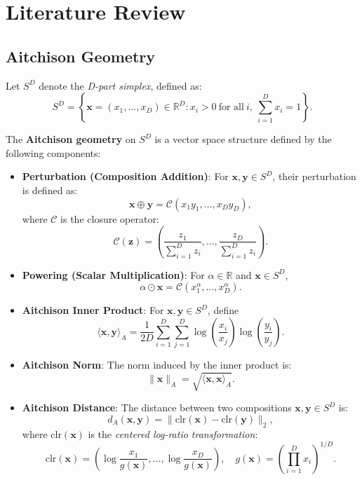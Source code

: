 \documentclass[article]{abntex2}
\begin{document}
\section{Literature Review}



\subsection*{Aitchison Geometry}

Let $S^D$ denote the \emph{D-part simplex}, defined as:
\[
S^D = \left\{ \mathbf{x} = (x_1, \dots, x_D) \in \mathbb{R}^D : x_i > 0 \ \text{for all} \ i, \ \sum_{i=1}^D x_i = 1 \right\}.
\]

The \textbf{Aitchison geometry} on $S^D$ is a vector space structure defined by the following components:

\begin{itemize}
    \item \textbf{Perturbation (Composition Addition)}: For $\mathbf{x}, \mathbf{y} \in S^D$, their perturbation is defined as:
    \[
    \mathbf{x} \oplus \mathbf{y} = \mathcal{C}(x_1 y_1, \dots, x_D y_D),
    \]
    where $\mathcal{C}$ is the closure operator:
    \[
    \mathcal{C}(\mathbf{z}) = \left( \frac{z_1}{\sum_{i=1}^D z_i}, \dots, \frac{z_D}{\sum_{i=1}^D z_i} \right).
    \]
    
    \item \textbf{Powering (Scalar Multiplication)}: For $\alpha \in \mathbb{R}$ and $\mathbf{x} \in S^D$,
    \[
    \alpha \odot \mathbf{x} = \mathcal{C}(x_1^\alpha, \dots, x_D^\alpha).
    \]
    
    \item \textbf{Aitchison Inner Product}: For $\mathbf{x}, \mathbf{y} \in S^D$, define
    \[
    \langle \mathbf{x}, \mathbf{y} \rangle_A = \frac{1}{2D} \sum_{i=1}^D \sum_{j=1}^D \log\left(\frac{x_i}{x_j}\right) \log\left(\frac{y_i}{y_j}\right).
    \]
    
    \item \textbf{Aitchison Norm}: The norm induced by the inner product is:
    \[
    \|\mathbf{x}\|_A = \sqrt{\langle \mathbf{x}, \mathbf{x} \rangle_A}.
    \]
    
    \item \textbf{Aitchison Distance}: The distance between two compositions $\mathbf{x}, \mathbf{y} \in S^D$ is:
    \[
    d_A(\mathbf{x}, \mathbf{y}) = \|\text{clr}(\mathbf{x}) - \text{clr}(\mathbf{y})\|_2,
    \]
    where $\text{clr}(\mathbf{x})$ is the \emph{centered log-ratio transformation}:
    \[
    \text{clr}(\mathbf{x}) = \left( \log\frac{x_1}{g(\mathbf{x})}, \dots, \log\frac{x_D}{g(\mathbf{x})} \right), \quad g(\mathbf{x}) = \left( \prod_{i=1}^D x_i \right)^{1/D}.
    \]
\end{itemize}
\end{document}
